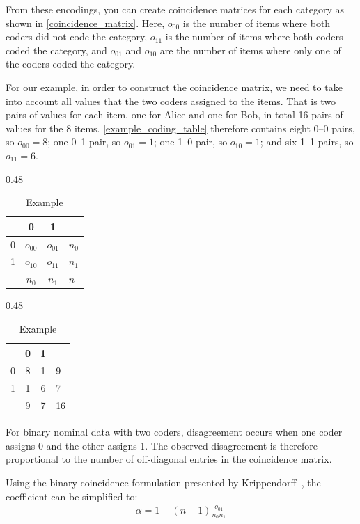 From these encodings, you can create coincidence matrices for each category as shown in \autoref{coincidence_matrix}. Here, \(o_{00}\) is the number of items where both coders did not code the category, \(o_{11}\) is the number of items where both coders coded the category, and \(o_{01}\) and \(o_{10}\) are the number of items where only one of the coders coded the category.

For our example, in order to construct the coincidence matrix, we need to take into account all values that the two coders assigned to the items. That is two pairs of values for each item, one for Alice and one for Bob, in total 16 pairs of values for the 8 items. \autoref{example_coding_table} therefore contains eight 0–0 pairs, so \(o_{00} = 8\); one 0–1 pair, so \(o_{01} = 1\); one 1–0 pair, so \(o_{10} = 1\); and six 1–1 pairs, so \(o_{11} = 6\).

\begin{table}[h]
\centering
\caption{Coincidence matrices in general form and for the example coding in \autoref{example_coding_table}}
\label{coding_tables_sidebyside}
\begin{subtable}[t]{0.48\linewidth}
\centering
\begin{tabular}{l|cc|l}
& 0 & 1 & \\
\hline
0 & $o_{00}$ & $o_{01}$ & $n_0$ \\
1 & $o_{10}$ & $o_{11}$ & $n_1$ \\
\hline
& $n_0$ & $n_1$ & $n$
\end{tabular}
\caption{General form}
\label{coincidence_matrix}
\end{subtable}\hfill
\begin{subtable}[t]{0.48\linewidth}
\centering
\begin{tabular}{l|cc|l}
& 0 & 1 & \\
\hline
0 & 8 & 1 & 9 \\
1 & 1 & 6 & 7 \\
\hline
& 9 & 7 & 16
\end{tabular}
\caption{Example}
\label{coincidence_matrix_example}
\end{subtable}
\end{table}

For binary nominal data with two coders, disagreement occurs
when one coder assigns 0 and the other assigns 1. The observed
disagreement is therefore proportional to the number of off-diagonal
entries in the coincidence matrix.

Using the binary coincidence formulation presented by
Krippendorff~\cite{krippendorff_content_2004}, the coefficient
can be simplified to:
\begin{align}
    \alpha = 1 - (n-1)\frac{o_{01}}{n_0 n_1}
\end{align}

